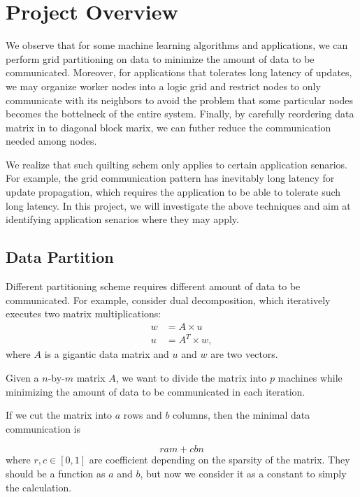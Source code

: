 \documentclass{acm_proc_article-sp}
\begin{document}
\section{Project Overview}

We observe that for some machine learning algorithms and applications, we can
perform grid partitioning on data to minimize the amount of data to be
communicated. Moreover, for applications that tolerates long latency of updates,
we may organize worker nodes into a logic grid and restrict nodes to only
communicate with its neighbors to avoid the problem that some particular nodes
becomes the bottelneck of the entire system. Finally, by carefully reordering
data matrix in to diagonal block marix, we can futher reduce the
communication needed among nodes.

We realize that such quilting schem only applies to certain application
senarios. For example, the grid communication pattern has inevitably long
latency for update propagation, which requires the application to be able to
tolerate such long latency. In this project, we will investigate the above
techniques and aim at identifying application senarios where they may apply.

\subsection{Data Partition}
Different partitioning scheme requires different amount of data to be
communicated. For example, consider dual decomposition,
which iteratively executes two matrix multiplications:
\begin{align*}
w &= A \times u \\
u &= A^T \times w,
\end{align*}
where $A$ is a gigantic data matrix and $u$ and $w$ are two vectors.

Given a $n$-by-$m$ matrix $A$, we want to divide the matrix into $p$ machines
while minimizing the amount of data to be communicated in each iteration.

If we cut the matrix into $a$ rows and $b$ columns, then the minimal data
communication is

\begin{equation}
  r  am +  c bn
  \label{eq:total-traffic}
\end{equation}
where $r,c \in [0,1]$ are coefficient depending on the sparsity of the
matrix. They should be a function as $a$ and $b$, but now we consider it as a
constant to simply the calculation.
\end{document}

